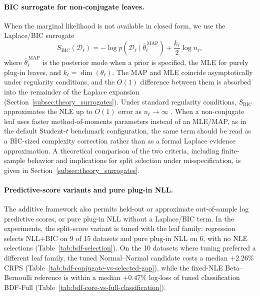 \documentclass[10pt]{article} %
\begin{document}
\paragraph{BIC surrogate for non-conjugate leaves.}
When the marginal likelihood is not available in closed form, we use the Laplace/BIC surrogate
\begin{equation}\label{eq:bic_leaf}
S_{\mathrm{BIC}}(\mathcal{D}_\ell)
=
-\log p(\mathcal{D}_\ell \mid \hat{\theta}_\ell^{\,\mathrm{MAP}})
+
\frac{k_\ell}{2}\log n_\ell,
\end{equation}
where $\hat{\theta}_\ell^{\,\mathrm{MAP}}$ is the posterior mode when a prior is specified, the MLE for purely plug-in leaves, and $k_\ell = \dim(\theta_\ell)$. The MAP and MLE coincide asymptotically under regularity conditions, and the $O(1)$ difference between them is absorbed into the remainder of the Laplace expansion (Section~\ref{subsec:theory_surrogates}). Under standard regularity conditions, $S_{\mathrm{BIC}}$ approximates the NLE up to $O(1)$ error as $n_\ell \to \infty$ \citep{schwarz1978estimating}. When a non-conjugate leaf uses faster method-of-moments parameters instead of an MLE/MAP, as in the default Student-$t$ benchmark configuration, the same term should be read as a BIC-sized complexity correction rather than as a formal Laplace evidence approximation. A theoretical comparison of the two criteria, including finite-sample behavior and implications for split selection under misspecification, is given in Section~\ref{subsec:theory_surrogates}.

\paragraph{Predictive-score variants and pure plug-in NLL.}
The additive framework also permits held-out or approximate out-of-sample log predictive scores, or pure plug-in NLL without a Laplace/BIC term. In the experiments, the split-score variant is tuned with the leaf family: regression selects NLL+BIC on 9 of 15 datasets and pure plug-in NLL on 6, with no NLE selections (Table~\ref{tab:bdf-selection}). On the 10 datasets where tuning preferred a different leaf family, the tuned Normal--Normal candidate costs a median $+2.26\%$ CRPS (Table~\ref{tab:bdf-conjugate-vs-selected-gap}), while the fixed-NLE Beta--Bernoulli reference is within a median $+0.47\%$ log-loss of tuned classification BDF-Full (Table~\ref{tab:bdf-core-vs-full-classification}).
\end{document}
